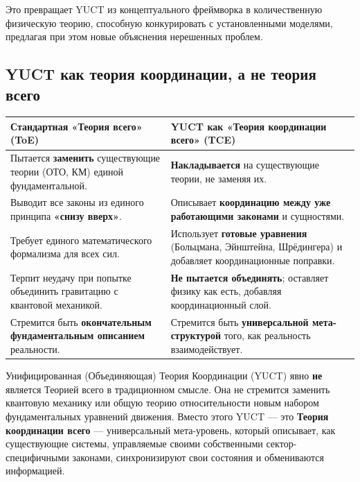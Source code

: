 \documentclass[11pt,a4paper]{article}
\begin{document}
	Это превращает YUCT из концептуального фреймворка в количественную физическую теорию, способную конкурировать с установленными моделями, предлагая при этом новые объяснения нерешенных проблем.
	
	
	\subsection{YUCT как теория координации, а не теория всего}
	\label{subsec:not-toe}
	
	\begin{tcolorbox}[title=YUCT против стандартных теорий всего (ToE), 
		colback=blue!5!white, colframe=blue!50!black, 
		fonttitle=\bfseries, sharp corners]
		\small
		\begin{table}[H]
			\centering
			\begin{tabular}{p{0.45\textwidth} p{}}
				\toprule
				\textbf{Стандартная «Теория всего» (ToE)} & \textbf{YUCT как «Теория координации всего» (TCE)} \\
				\midrule
				Пытается \textbf{заменить} существующие теории (ОТО, КМ) единой фундаментальной. & \textbf{Накладывается} на существующие теории, не заменяя их. \\
				\addlinespace
				Выводит все законы из единого принципа \textbf{«снизу вверх»}. & Описывает \textbf{координацию между уже работающими законами} и сущностями. \\
				\addlinespace
				Требует единого математического формализма для всех сил. & Использует \textbf{готовые уравнения} (Больцмана, Эйнштейна, Шрёдингера) и добавляет координационные поправки. \\
				\addlinespace
				Терпит неудачу при попытке объединить гравитацию с квантовой механикой. & \textbf{Не пытается объединять}; оставляет физику как есть, добавляя координационный слой. \\
				\addlinespace
				Стремится быть \textbf{окончательным фундаментальным описанием} реальности. & Стремится быть \textbf{универсальной мета-структурой} того, как реальность взаимодействует. \\
				\bottomrule
			\end{tabular}
		\end{table}
	\end{tcolorbox}
	
	\vspace{0.5cm}
	\noindent
	Унифицированная (Объединяющая) Теория Координации (YUCT) явно \textbf{не} является Теорией всего в традиционном смысле. Она не стремится заменить квантовую механику или общую теорию относительности новым набором фундаментальных уравнений движения. Вместо этого YUCT — это \textbf{Теория координации всего} — универсальный мета-уровень, который описывает, как существующие системы, управляемые своими собственными сектор-специфичными законами, синхронизируют свои состояния и обмениваются информацией.
	
\end{document}
